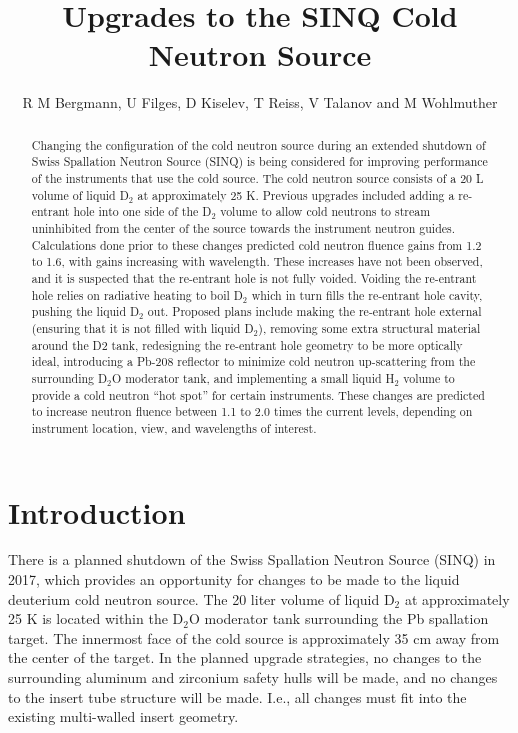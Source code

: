 \documentclass[a4paper]{jpconf}
\begin{document}
\title{Upgrades to the SINQ Cold Neutron Source}

\author{R M Bergmann, U Filges, D Kiselev, T Reiss, V Talanov and M Wohlmuther}

\address{Paul Scherrer Institut, 5232 Villigen, Switzerland}


\begin{abstract}Changing the configuration of the cold neutron source during an extended shutdown of Swiss Spallation Neutron Source (SINQ) is being considered for improving performance of the instruments that use the cold source.  The cold neutron source consists of a 20 L volume of liquid D$_2$ at approximately 25 K.  Previous upgrades included adding a re-entrant hole into one side of the D$_2$ volume to allow cold neutrons to stream uninhibited from the center of the source towards the instrument neutron guides.  Calculations done prior to these changes predicted cold neutron fluence gains from 1.2 to 1.6, with gains increasing with wavelength. These increases have not been observed, and it is suspected that the re-entrant hole is not fully voided.  Voiding the re-entrant hole relies on radiative heating to boil D$_2$ which in turn fills the re-entrant hole cavity, pushing the liquid D$_2$ out.  Proposed plans include making the re-entrant hole external (ensuring that it is not filled with liquid D$_2$), removing some extra structural material around the D2 tank, redesigning the re-entrant hole geometry to be more optically ideal, introducing a Pb-208 reflector to minimize cold neutron up-scattering from the surrounding D$_2$O moderator tank, and implementing a small liquid H$_2$ volume to provide a cold neutron “hot spot” for certain instruments.  These changes are predicted to increase neutron fluence between 1.1 to 2.0 times the current levels, depending on instrument location, view, and wavelengths of interest.
\end{abstract}


\section{Introduction}

There is a planned shutdown of the Swiss Spallation Neutron Source (SINQ) in 2017, which provides an opportunity for changes to be made to the liquid deuterium cold neutron source.  The 20 liter volume of liquid D$_2$ at approximately 25 K is located within the D$_2$O moderator tank surrounding the Pb spallation target.  The innermost face of the cold source is approximately 35 cm away from the center of the target.  In the planned upgrade strategies, no changes to the surrounding aluminum and zirconium safety hulls will be made, and no changes to the insert tube structure will be made.  I.e., all changes must fit into the existing multi-walled insert geometry.  
\end{document}
